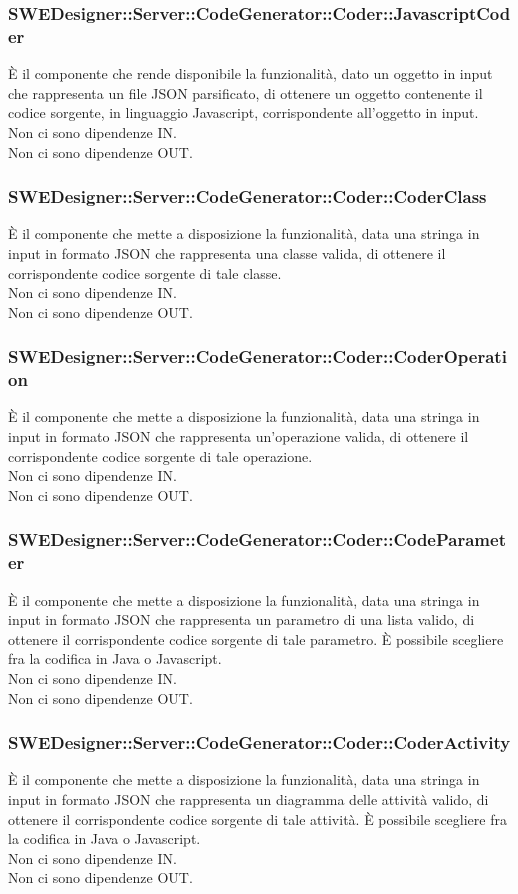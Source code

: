 \documentclass[../PianoDiQualifica.tex]{subfiles}
\begin{document}
		\subsubsection{SWEDesigner::Server::CodeGenerator::Coder::JavascriptCoder}
		È il componente che rende disponibile la funzionalità, dato un oggetto in input che rappresenta un file JSON parsificato, di ottenere un oggetto contenente il codice sorgente, in linguaggio Javascript, corrispondente all'oggetto in input.\\
		Non ci sono dipendenze IN.\\
		Non ci sono dipendenze OUT.
		\subsubsection{SWEDesigner::Server::CodeGenerator::Coder::CoderClass}
		È il componente che mette a disposizione la funzionalità, data una stringa in input in formato JSON che rappresenta una classe valida, di ottenere il corrispondente codice sorgente di tale classe.\\
		Non ci sono dipendenze IN.\\
		Non ci sono dipendenze OUT.
		\subsubsection{SWEDesigner::Server::CodeGenerator::Coder::CoderOperation}
		È il componente che mette a disposizione la funzionalità, data una stringa in input in formato JSON che rappresenta un'operazione valida, di ottenere il corrispondente codice sorgente di tale operazione.\\
		Non ci sono dipendenze IN.\\
		Non ci sono dipendenze OUT.
		\subsubsection{SWEDesigner::Server::CodeGenerator::Coder::CodeParameter}
		È il componente che mette a disposizione la funzionalità, data una stringa in input in formato JSON che rappresenta un parametro di una lista valido, di ottenere il corrispondente codice sorgente di tale parametro. È possibile scegliere fra la codifica in Java o Javascript.\\
		Non ci sono dipendenze IN.\\
		Non ci sono dipendenze OUT.
		\subsubsection{SWEDesigner::Server::CodeGenerator::Coder::CoderActivity}
		È il componente che mette a disposizione la funzionalità, data una stringa in input in formato JSON che rappresenta un diagramma delle attività valido, di ottenere il corrispondente codice sorgente di tale attività. È possibile scegliere fra la codifica in Java o Javascript.\\
		Non ci sono dipendenze IN.\\
		Non ci sono dipendenze OUT.
\end{document}
